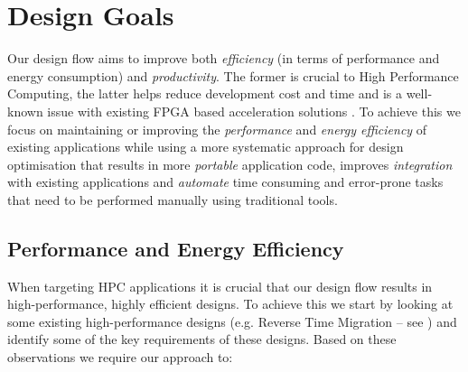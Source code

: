 \section{Design Goals}

Our design flow aims to improve both \emph{efficiency} (in terms of
performance and energy consumption) and \emph{productivity}. The
former is crucial to High Performance Computing, the latter helps
reduce development cost and time and is a well-known issue with
existing FPGA based acceleration solutions . To achieve this we focus
on maintaining or improving the \emph{performance} and \emph{energy
  efficiency} of existing applications while using a more systematic
approach for design optimisation that results in more \emph{portable}
application code, improves \emph{integration} with existing
applications and \emph{automate} time consuming and error-prone tasks
that need to be performed manually using traditional tools.

\subsection{Performance and Energy Efficiency}
When targeting HPC applications it is crucial that our design flow
results in high-performance, highly efficient designs. To achieve this
we start by looking at some existing high-performance designs
(e.g. Reverse Time Migration -- see ) and identify some
of the key requirements of these designs. Based on these observations
we require our approach to:

